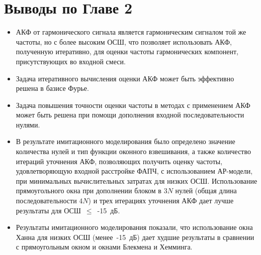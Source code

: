 \section{Выводы по Главе 2}

\begin{itemize}
\item АКФ от гармонического сигнала является гармоническим сигналом той же частоты, но с более высоким ОСШ, что позволяет использовать АКФ, полученную итеративно,
	для оценки частоты гармонических компонент, присутствующих во входной смеси.

\item Задача итеративного вычисления оценки АКФ может быть эффективно решена в базисе Фурье.

\item Задача повышения точности оценки частоты в методах с применением АКФ может быть решена при помощи дополнения входной последовательности нулями.

\item В результате имитационного моделирования было определено значение количества нулей и тип функции оконного взвешивания, а также количество итераций уточнения АКФ,
	позволяющих получить оценку частоты, удовлетворяющую входной расстройке ФАПЧ, с использованием АР-модели, при минимальных вычислительных затратах для низких ОСШ.
	Использование прямоугольного окна при дополнении блоком в ${3N}$ нулей (общая длина последовательности ${4N}$) и трех итерациях уточнения АКФ дает лучше результаты
	для  \mbox{ОСШ ${\le}$ -15 дБ.}

\item Результаты имитационного моделирования показали, что использование окна Ханна для низких ОСШ \mbox{(менее -15 дБ)} дает худшие результаты в сравнении с прямоугольным
	окном и окнами Блекмена и Хемминга.

\end{itemize}

\clearpage
{}			%

\clearpage
